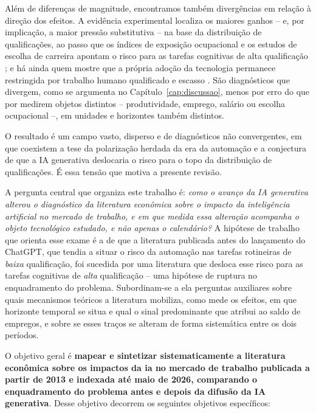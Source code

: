 Além de diferenças de magnitude, encontramos também divergências em relação à direção dos efeitos. A evidência experimental localiza os maiores ganhos -- e, por implicação, a maior pressão substitutiva -- na base da distribuição de qualificações, ao passo que os índices de exposição ocupacional e os estudos de escolha de carreira apontam o risco para as tarefas cognitivas de alta qualificação \parencite{eloundou2024, gollerGschwendtWolter2025}; e há ainda quem mostre que a própria adoção da tecnologia permanece restringida por trabalho humano qualificado e escasso \parencite{fontanelli2025}. São diagnósticos que divergem, como se argumenta no Capítulo~\ref{cap:discussao}, menos por erro do que por medirem objetos distintos -- produtividade, emprego, salário ou escolha ocupacional --, em unidades e horizontes também distintos.

O resultado é um campo vasto, disperso e de diagnósticos não convergentes, em que coexistem a tese da polarização herdada da era da automação e a conjectura de que a IA generativa deslocaria o risco para o topo da distribuição de qualificações. É essa tensão que motiva a presente revisão.

A pergunta central que organiza este trabalho é: \emph{como o avanço da IA generativa alterou o diagnóstico da literatura econômica sobre o impacto da inteligência artificial no mercado de trabalho, e em que medida essa alteração acompanha o objeto tecnológico estudado, e não apenas o calendário?} A hipótese de trabalho que orienta esse exame é a de que a literatura publicada antes do lançamento do ChatGPT, que tendia a situar o risco da automação nas tarefas rotineiras de \emph{baixa} qualificação, foi sucedida por uma literatura que desloca esse risco para as tarefas cognitivas de \emph{alta} qualificação -- uma hipótese de ruptura no enquadramento do problema. Subordinam-se a ela perguntas auxiliares sobre quais mecanismos teóricos a literatura mobiliza, como mede os efeitos, em que horizonte temporal se situa e qual o sinal predominante que atribui ao saldo de empregos, e sobre se esses traços se alteram de forma sistemática entre os dois períodos.

O objetivo geral é \textbf{mapear e sintetizar sistematicamente a literatura econômica sobre os impactos da \gls{ia} no mercado de trabalho publicada a partir de 2013 e indexada até maio de 2026, comparando o enquadramento do problema antes e depois da difusão da IA generativa}. Desse objetivo decorrem os seguintes objetivos específicos:

